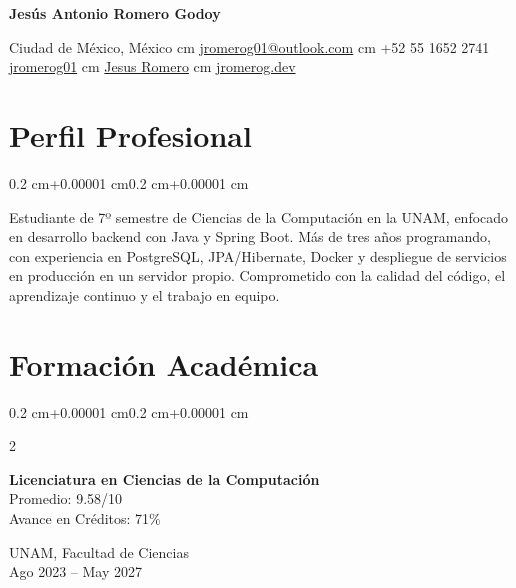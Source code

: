 \documentclass[10pt, letterpaper]{article}
\newenvironment{onecolentry}{
    \begin{adjustwidth}{0.2 cm+0.00001 cm}{0.2 cm+0.00001 cm}
}{
    \end{adjustwidth}
}
\newenvironment{twocolentry}[2][]{
    \onecolentry
    \def\secondColumn{#2}
    \setcolumnwidth{\fill, 4.5 cm}
    \begin{paracol}{2}
}{
    \switchcolumn \raggedleft \secondColumn
    \end{paracol}
    \endonecolentry
}
\newenvironment{header}{
    \setlength{\topsep}{0pt}\par\kern\topsep\centering\color{primaryColor}\linespread{1.5}
}{
    \par\kern\topsep
}
\newcommand{\placelastupdatedtext}{
  \AddToShipoutPictureFG*{
    \put(
        \LenToUnit{\paperwidth-2 cm-0.2 cm+0.05cm},
        \LenToUnit{\paperheight-1.0 cm}
    ){\vtop{{\null}\makebox[0pt][c]{
        \small\color{gray}\textit{Julio 2026}
    }}}%
  }%
}
\begin{document}
    \placelastupdatedtext

\begin{header}
    \fontsize{30 pt}{30 pt}\selectfont
    \textbf{Jesús Antonio Romero Godoy}

    \vspace{0.3 cm}

    \normalsize
    \faMapMarker* \hspace{0.13cm} Ciudad de México, México
     cm
    \faEnvelope[regular] \hspace{0.13cm} \href{mailto:jromerog01@outlook.com}{jromerog01@outlook.com}
     cm
    \faPhone* \hspace{0.13cm} +52 55 1652 2741
    \\
    \faGithub \hspace{0.13cm} \href{https://github.com/jromerog01}{jromerog01}
     cm
    \faLinkedin \hspace{0.13cm} \href{https://www.linkedin.com/in/jesus-antonio-romero-godoy-8a9032383/}{Jesus Romero}
     cm
    \faGlobe \hspace{0.13cm} \href{https://jromerog.dev/}{jromerog.dev}
\end{header}

\vspace{0.5 cm}

\section{Perfil Profesional}
\begin{onecolentry}
Estudiante de 7º semestre de Ciencias de la Computación en la UNAM, enfocado en desarrollo backend con Java y Spring Boot. Más de tres años programando, con experiencia en PostgreSQL, JPA/Hibernate, Docker y despliegue de servicios en producción en un servidor propio. Comprometido con la calidad del código, el aprendizaje continuo y el trabajo en equipo.
\end{onecolentry}

\section{Formación Académica}
\begin{twocolentry}{
    UNAM, Facultad de Ciencias\\
    Ago 2023 – May 2027
}
    \textbf{Licenciatura en Ciencias de la Computación} \\
    Promedio: 9.58/10 \\
    Avance en Créditos: 71\%
\end{twocolentry}
\end{document}

